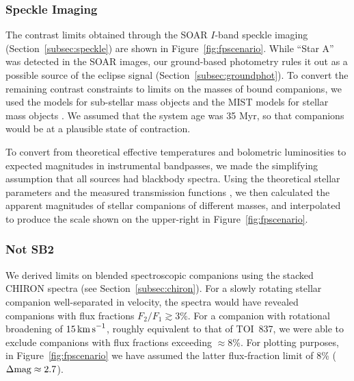 \documentclass[12pt,twocolumn,tighten]{aastex63}
\newcommand{\tn}{TOI~837} %
\begin{document}
\subsubsection{Speckle Imaging}
\label{subsec:speckleconstraint}
The contrast limits obtained through the SOAR $I$-band speckle imaging
(Section~\ref{subsec:speckle}) are shown in
Figure~\ref{fig:fpscenario}.  While ``Star A'' was detected in the
SOAR images, our ground-based photometry rules it out as a possible
source of the eclipse signal (Section~\ref{subsec:groundphot}).  To
convert the remaining contrast constraints to limits on the masses of
bound companions, we used the \citet{baraffe_evolutionary_2003} models
for sub-stellar mass objects and the MIST models for stellar mass
objects
\citep{paxton_modules_2011,paxton_modules_2013,paxton_modules_2015,dotter_mesa_2016,choi_mesa_2016}.
We assumed that the system age was 35 Myr, so that companions would be
at a plausible state of contraction.

To convert from theoretical effective temperatures and bolometric
luminosities to expected magnitudes in instrumental bandpasses, we
made the simplifying assumption that all sources had blackbody
spectra.  Using the theoretical stellar parameters and the measured
transmission functions \citep{tokovinin_ten_2018}, we then calculated
the apparent magnitudes of stellar companions of different masses, and
interpolated to produce the scale shown on the upper-right in
Figure~\ref{fig:fpscenario}.

\subsubsection{Not SB2}
We derived limits on blended spectroscopic companions using the
stacked CHIRON spectra (see Section~\ref{subsec:chiron}).  For a
slowly rotating stellar companion well-separated in velocity, the
spectra would have revealed companions with flux fractions $F_2/F_1
\gtrsim 3\%$.  For a companion with rotational broadening of $15\,{\rm
km\,s}^{-1}$, roughly equivalent to that of \tn, we were able to
exclude companions with flux fractions exceeding $\approx$8\%.  For
plotting purposes, in Figure~\ref{fig:fpscenario} we have assumed the
latter flux-fraction limit of 8\% ($\Delta {\rm mag} \approx 2.7$).
\end{document}
